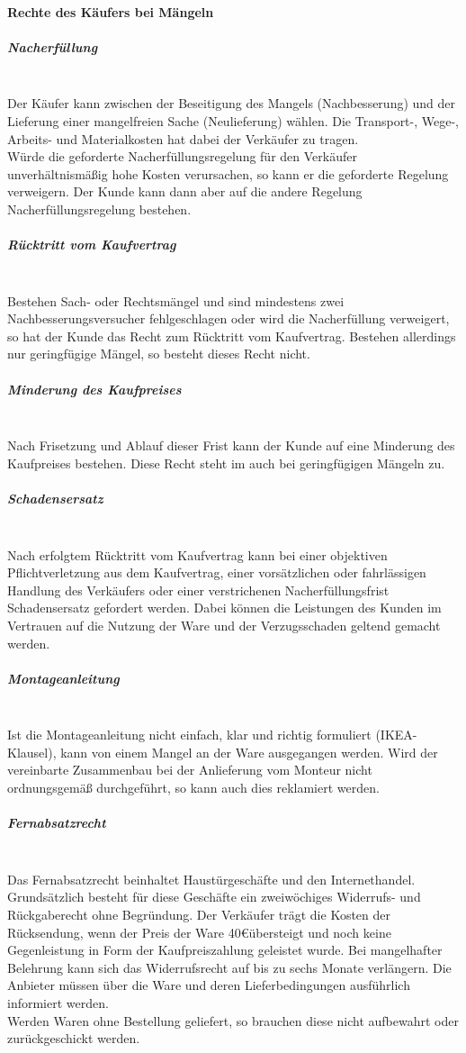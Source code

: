 	\paragraph{Rechte des Käufers bei Mängeln}
		\subparagraph{Nacherfüllung}~\\Der Käufer kann zwischen der Beseitigung des Mangels (Nachbesserung) und der Lieferung einer mangelfreien Sache (Neulieferung) wählen. Die Transport-, Wege-, Arbeits- und Materialkosten hat dabei der Verkäufer zu tragen.\\
		 Würde die geforderte Nacherfüllungsregelung für den Verkäufer unverhältnismäßig hohe Kosten verursachen, so kann er die geforderte Regelung verweigern. Der Kunde kann dann aber auf die andere Regelung Nacherfüllungsregelung bestehen.
		\subparagraph{Rücktritt vom Kaufvertrag}~\\Bestehen Sach- oder Rechtsmängel und sind mindestens zwei Nachbesserungsversucher fehlgeschlagen oder wird die Nacherfüllung verweigert, so hat der Kunde das Recht zum Rücktritt vom Kaufvertrag. Bestehen allerdings nur geringfügige Mängel, so besteht dieses Recht nicht.
		\subparagraph{Minderung des Kaufpreises}~\\Nach Frisetzung und Ablauf dieser Frist kann der Kunde auf eine Minderung des Kaufpreises bestehen. Diese Recht steht im auch bei geringfügigen Mängeln zu.
		\subparagraph{Schadensersatz}~\\Nach erfolgtem Rücktritt vom Kaufvertrag kann bei einer objektiven Pflichtverletzung aus dem Kaufvertrag, einer vorsätzlichen oder fahrlässigen Handlung des Verkäufers oder einer verstrichenen Nacherfüllungsfrist Schadensersatz gefordert werden. Dabei können die Leistungen des Kunden im Vertrauen auf die Nutzung der Ware und der Verzugsschaden geltend gemacht werden.
		\subparagraph{Montageanleitung}~\\Ist die Montageanleitung nicht einfach, klar und richtig formuliert (IKEA-Klausel), kann von einem Mangel an der Ware ausgegangen werden. Wird der vereinbarte Zusammenbau bei der Anlieferung vom Monteur nicht ordnungsgemäß durchgeführt, so kann auch dies reklamiert werden.
		\subparagraph{Fernabsatzrecht}~\\Das Fernabsatzrecht beinhaltet Haustürgeschäfte und den Internethandel. Grundsätzlich besteht für diese Geschäfte ein zweiwöchiges Widerrufs- und Rückgaberecht ohne Begründung. Der Verkäufer trägt die Kosten der Rücksendung, wenn der Preis der Ware 40\euro übersteigt und noch keine Gegenleistung in Form der Kaufpreiszahlung geleistet wurde. Bei mangelhafter Belehrung kann sich das Widerrufsrecht auf bis zu sechs Monate verlängern. Die Anbieter müssen über die Ware und deren Lieferbedingungen ausführlich informiert werden. \\
		Werden Waren ohne Bestellung geliefert, so brauchen diese nicht aufbewahrt oder zurückgeschickt werden. 
		
